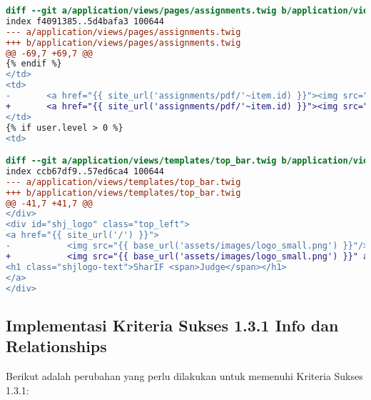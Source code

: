 \begin{itemize}
\begin{lstlisting}[language=diff, caption=Perubahan untuk mematuhi kriteria 1.1.1, label=lst_1.1.1, basicstyle=\ttfamily, frame=single,
columns=fullflexible, keepspaces=true, breaklines=true]
diff --git a/application/views/pages/assignments.twig b/application/views/pages/assignments.twig
index f4091385..5d4bafa3 100644
--- a/application/views/pages/assignments.twig
+++ b/application/views/pages/assignments.twig
@@ -69,7 +69,7 @@
{% endif %}
</td>
<td>
- 		<a href="{{ site_url('assignments/pdf/'~item.id) }}"><img src="{{ base_url('assets/images/pdf.svg') }}" /></a>
+ 		<a href="{{ site_url('assignments/pdf/'~item.id) }}"><img src="{{ base_url('assets/images/pdf.svg') }}" aria-label="Download PDF For Assignment {{ item.name }}"/></a>
</td>
{% if user.level > 0 %}
<td>

diff --git a/application/views/templates/top_bar.twig b/application/views/templates/top_bar.twig
index ccb67df9..57ed6ca4 100644
--- a/application/views/templates/top_bar.twig
+++ b/application/views/templates/top_bar.twig
@@ -41,7 +41,7 @@
</div>
<div id="shj_logo" class="top_left">
<a href="{{ site_url('/') }}">
- 			<img src="{{ base_url('assets/images/logo_small.png') }}"/>
+ 			<img src="{{ base_url('assets/images/logo_small.png') }}" aria-label="Logo SharIF Judge"/>
<h1 class="shjlogo-text">SharIF <span>Judge</span></h1>
</a>
</div>
\end{lstlisting}

\end{itemize}

\subsection{Implementasi Kriteria Sukses 1.3.1 Info dan Relationships}
\label{subsec:implementasi_A_1.3.1}

Berikut adalah perubahan yang perlu dilakukan untuk memenuhi Kriteria Sukses 1.3.1:

